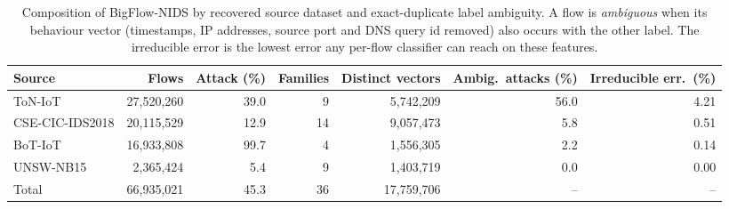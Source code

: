 \begin{table}[t]
\centering
\small
\caption{Composition of BigFlow-NIDS by recovered source dataset and exact-duplicate label ambiguity. A flow is \emph{ambiguous} when its behaviour vector (timestamps, IP addresses, source port and DNS query id removed) also occurs with the other label. The irreducible error is the lowest error any per-flow classifier can reach on these features.}
\label{tab:sources}
\begin{tabular}{lrrrrrr}
\toprule
Source & Flows & Attack (\%) & Families & Distinct vectors & Ambig.\ attacks (\%) & Irreducible err.\ (\%) \\
\midrule
ToN-IoT & 27,520,260 & 39.0 & 9 & 5,742,209 & 56.0 & 4.21 \\
CSE-CIC-IDS2018 & 20,115,529 & 12.9 & 14 & 9,057,473 & 5.8 & 0.51 \\
BoT-IoT & 16,933,808 & 99.7 & 4 & 1,556,305 & 2.2 & 0.14 \\
UNSW-NB15 & 2,365,424 & 5.4 & 9 & 1,403,719 & 0.0 & 0.00 \\
\midrule
Total & 66,935,021 & 45.3 & 36 & 17,759,706 & -- & -- \\
\bottomrule
\end{tabular}
\end{table}
